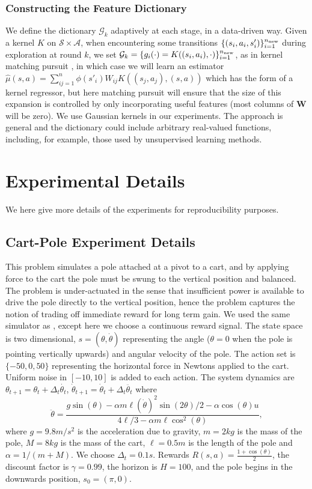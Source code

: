 \documentclass[letterpaper]{article}
\newcommand{\BengioKernelMP}{DBLP:journals/ml/VincentB02}
\newcommand{\cA}{{\mathcal A}}
\newcommand{\cS}{{\mathcal S}}
\newcommand{\cG}{{\mathcal G}}
\newcommand{\bW}{{\bm W}}
\begin{document}
\subsubsection{Constructing the Feature Dictionary}

We define the dictionary $\cG_k$ adaptively at each stage, in a data-driven way. Given a kernel $K$ on $\cS\times\cA$, when encountering some transitions $\{(s_i,a_i,s'_i)\}_{i=1}^{n_{\rm new}}$ during exploration at round $k$, we set $\cG_k = \{g_i(\cdot) = K((s_i,a_i),\cdot)\}_{i=1}^{n_{\rm new}}$, as in kernel matching pursuit \citep{\BengioKernelMP}, in which case we will learn an estimator $\hat\mu(s,a) = \sum_{ij=1}^{n} \phi(s'_i) W_{ij} K((s_j,a_j),(s,a))$ which has the form of a kernel regressor, but here matching pursuit will ensure that the size of this expansion is controlled by only incorporating useful features (most columns of $\bW$ will be zero). We use Gaussian kernels in our experiments. The approach is general and the dictionary could include arbitrary real-valued functions, including, for example, those used by unsupervised learning methods.

\section{Experimental Details} \label{ExperimentDetails}

We here give more details of the experiments for reproducibility purposes. 

\subsection{Cart-Pole Experiment Details}

This problem simulates a pole attached at a pivot to a cart, and by applying force to the cart the pole must be swung to the vertical position and balanced. The problem is under-actuated in the sense that insufficient power is available to drive the pole directly to the vertical position, hence the problem captures the notion of trading off immediate reward for long term gain. We used the same simulator as \citet{DBLP:journals/jmlr/LagoudakisP03}, except here we choose a continuous reward signal. The state space is two dimensional, $s = (\theta, \dot{\theta})$ representing the angle ($\theta = 0$ when the pole is pointing vertically upwards) and angular velocity of the pole. The action set is $\{-50,0,50\}$ representing the horizontal force in Newtons applied to the cart. Uniform noise in $[-10,10]$ is added to each action. The system dynamics are $\theta_{t+1} = \theta_t + \Delta_t \dot {\theta_t}$, $\dot\theta_{t+1} = \dot\theta_t + \Delta_t \ddot {\theta_t}$ where
$$ \ddot {\theta} = \frac{g \sin(\theta) - \alpha m \ell (\dot{\theta})^2 \sin(2 \theta)/2 - \alpha \cos(\theta) u}{ 4\ell / 3 - \alpha m \ell \cos^2(\theta)}, $$
where $g=9.8m/s^2$ is the acceleration due to gravity, $m=2kg$ is the mass of the pole, $M = 8kg$ is the mass of the cart, $\ell = 0.5m$ is the length of the pole and $\alpha = 1/(m+M)$. We choose $\Delta_t = 0.1s$. Rewards $R(s,a) = \frac{1+ \cos(\theta)}{2}$, the discount factor is $\gamma = 0.99$, the horizon is $H=100$, and the pole begins in the downwards position, $s_0 = (\pi,0)$.
\end{document}
